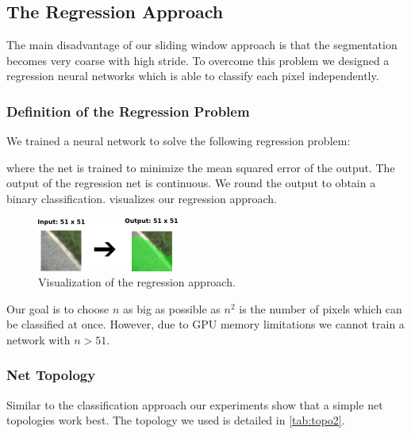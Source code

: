 \subsection{The Regression Approach}
The main disadvantage of our sliding window approach is that the segmentation
becomes very coarse with high stride. To overcome this problem we designed a
regression neural networks which is able to classify each pixel independently.

\subsubsection{Definition of the Regression Problem}
We trained a neural network to solve the following regression problem:


where the net is trained to minimize the mean squared error of the output. The
output of the regression net is continuous. We round the output to obtain a
binary classification.  visualizes our regression approach.

\begin{figure}[H]
	\centering
	\includegraphics[width=0.5\columnwidth]{figures/models/fully-conv.png}
	\caption{Visualization of the regression approach.}
	\label{fig:reg}
\end{figure}

Our goal is to choose $n$ as big as possible as $n^2$ is the number of pixels
which can be classified at once. However, due to GPU memory limitations we
cannot train a network with $n > 51$.


\subsubsection{Net Topology}
Similar to the classification approach our experiments show that a simple net
topologies work best. The topology we used is detailed in \cref{tab:topo2}.

